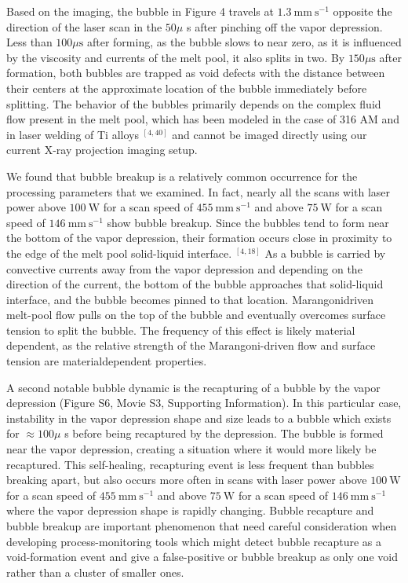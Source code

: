 \documentclass[10pt]{article}
\begin{document}
Based on the imaging, the bubble in Figure 4 travels at $1.3 \mathrm{~mm} \mathrm{~s}^{-1}$ opposite the direction of the laser scan in the $50 \mu$ s after pinching off the vapor depression. Less than $100 \mu \mathrm{s}$ after forming, as the bubble slows to near zero, as it is influenced by the viscosity and currents of the melt pool, it also splits in two. By $150 \mu \mathrm{s}$ after formation, both bubbles are trapped as void defects with the distance between their centers at the approximate location of the bubble immediately before splitting. The behavior of the bubbles primarily depends on the complex fluid flow present in the melt pool, which has been modeled in the case of 316 AM and in laser welding of Ti alloys ${ }^{[4,40]}$ and cannot be imaged directly using our current X-ray projection imaging setup.

We found that bubble breakup is a relatively common occurrence for the processing parameters that we examined. In fact, nearly all the scans with laser power above $100 \mathrm{~W}$ for a scan speed of $455 \mathrm{~mm} \mathrm{~s}^{-1}$ and above $75 \mathrm{~W}$ for a scan speed of $146 \mathrm{~mm} \mathrm{~s}^{-1}$ show bubble breakup. Since the bubbles tend to form near the bottom of the vapor depression, their formation occurs close in proximity to the edge of the melt pool solid-liquid interface. ${ }^{[4,18]}$ As a bubble is carried by convective currents away from the vapor depression and depending on the direction of the current, the bottom of the bubble approaches that solid-liquid interface, and the bubble becomes pinned to that location. Marangonidriven melt-pool flow pulls on the top of the bubble and eventually overcomes surface tension to split the bubble. The frequency of this effect is likely material dependent, as the relative strength of the Marangoni-driven flow and surface tension are materialdependent properties.

A second notable bubble dynamic is the recapturing of a bubble by the vapor depression (Figure S6, Movie S3, Supporting Information). In this particular case, instability in the vapor depression shape and size leads to a bubble which exists for $\approx 100 \mu$ s before being recaptured by the depression. The bubble is formed near the vapor depression, creating a situation where it would more likely be recaptured. This self-healing, recapturing event is less frequent than bubbles breaking apart, but also occurs more often in scans with laser power above $100 \mathrm{~W}$ for a scan speed of $455 \mathrm{~mm} \mathrm{~s}^{-1}$ and above $75 \mathrm{~W}$ for a scan speed of $146 \mathrm{~mm} \mathrm{~s}^{-1}$ where the vapor depression shape is rapidly changing. Bubble recapture and bubble breakup are important phenomenon that need careful consideration when developing process-monitoring tools which might detect bubble recapture as a void-formation event and give a false-positive or bubble breakup as only one void rather than a cluster of smaller ones.
\end{document}
